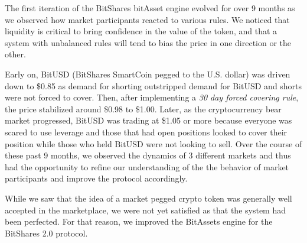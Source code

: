 \label{sec:bitassets1}

The first iteration of the BitShares bitAsset engine evolved for over 9 months
as we observed how market participants reacted to various rules. We noticed
that liquidity is critical to bring confidence in the value of the token, and
that a system with unbalanced rules will tend to bias the price in one
direction or the other.

Early on, BitUSD (BitShares SmartCoin pegged to the U.S. dollar) was driven
down to \$0.85 as demand for shorting outstripped demand for BitUSD and shorts
were not forced to cover. Then, after implementing a \emph{30 day forced
covering rule}, the price stabilized around \$0.98 to \$1.00. Later, as the
cryptocurrency bear market progressed, BitUSD was trading at \$1.05 or more
because everyone was scared to use leverage and those that had open positions
looked to cover their position while those who held BitUSD were not looking to
sell. Over the course of these past 9 months, we observed the dynamics of 3
different markets and thus had the opportunity to refine our understanding of
the the behavior of market participants and improve the protocol accordingly.

While we saw that the idea of a market pegged crypto token was generally well
accepted in the marketplace, we were not yet satisfied as that the system had
been perfected. For that reason, we improved the BitAssets engine for the
BitShares 2.0 protocol.
